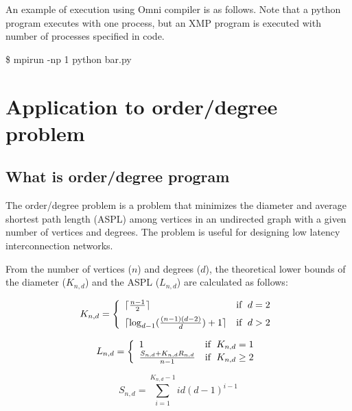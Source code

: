 \documentclass[graybox]{svmult}
\begin{document}
An example of execution using Omni compiler is as follows. 
Note that a python program executes with one process, but an XMP program is executed with number of processes specified in code.

\begin{svgraybox}
\$ mpirun -np 1 python bar.py
\end{svgraybox}

\section{Application to order/degree problem}
\subsection{What is order/degree program}
The order/degree problem is a problem that minimizes the diameter and average shortest path length (ASPL) among vertices in an undirected graph with a given number of vertices and degrees. 
The problem is useful for designing low latency interconnection networks\cite{graphgolf}.

From the number of vertices ($n$) and degrees ($d$), 
the theoretical lower bounds of the diameter ($K_{n,d}$) and the ASPL ($L_{n,d}$) are calculated as follows\cite{graphgolf,NET:NET3230040405}:

\begin{equation*}
K_{n,d} = \left\{
\begin{array}{ll}
\lceil \frac{n-1}{2} \rceil  & {\rm if}\phantom{a} d = 2 \\[5pt]
\lceil \log_{d-1} (\frac{(n-1)(d-2)}{d}) + 1 \rceil  & {\rm if}\phantom{a} d > 2
\end{array}
\right.
\end{equation*}

\begin{equation*}
L_{n,d} = \left\{
\begin{array}{ll}
1 & {\rm if}\phantom{a} K_{n,d} = 1 \\
\frac{S_{n,d}+K_{n,d}R_{n,d}}{n-1} & {\rm if}\phantom{a} K_{n,d} \geq 2
\end{array}
\right.
\end{equation*}

\begin{equation*}
S_{n,d} =
\sum_{i=1}^{K_{n,d}-1}  id(d-1)^{i-1} 
\end{equation*}
\end{document}
